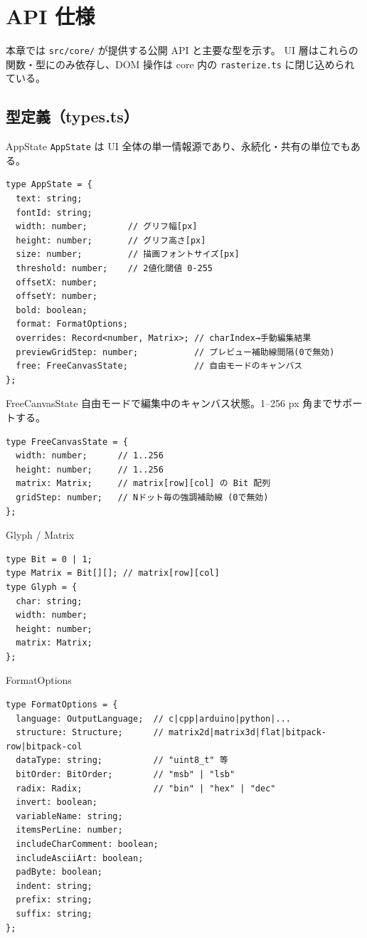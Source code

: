 \section{API 仕様}

本章では \texttt{src/core/} が提供する公開 API と主要な型を示す。
UI 層はこれらの関数・型にのみ依存し、DOM 操作は core 内の
\texttt{rasterize.ts} に閉じ込められている。

\subsection{型定義（types.ts）}

\begin{apibox}{AppState}
\texttt{AppState} は UI 全体の単一情報源であり、永続化・共有の単位でもある。

\begin{lstlisting}
type AppState = {
  text: string;
  fontId: string;
  width: number;        // グリフ幅[px]
  height: number;       // グリフ高さ[px]
  size: number;         // 描画フォントサイズ[px]
  threshold: number;    // 2値化閾値 0-255
  offsetX: number;
  offsetY: number;
  bold: boolean;
  format: FormatOptions;
  overrides: Record<number, Matrix>; // charIndex→手動編集結果
  previewGridStep: number;           // プレビュー補助線間隔(0で無効)
  free: FreeCanvasState;             // 自由モードのキャンバス
};
\end{lstlisting}
\end{apibox}

\begin{apibox}{FreeCanvasState}
自由モードで編集中のキャンバス状態。1--256 px 角までサポートする。

\begin{lstlisting}
type FreeCanvasState = {
  width: number;      // 1..256
  height: number;     // 1..256
  matrix: Matrix;     // matrix[row][col] の Bit 配列
  gridStep: number;   // Nドット毎の強調補助線 (0で無効)
};
\end{lstlisting}
\end{apibox}

\begin{apibox}{Glyph / Matrix}
\begin{lstlisting}
type Bit = 0 | 1;
type Matrix = Bit[][]; // matrix[row][col]
type Glyph = {
  char: string;
  width: number;
  height: number;
  matrix: Matrix;
};
\end{lstlisting}
\end{apibox}

\begin{apibox}{FormatOptions}
\begin{lstlisting}
type FormatOptions = {
  language: OutputLanguage;  // c|cpp|arduino|python|...
  structure: Structure;      // matrix2d|matrix3d|flat|bitpack-row|bitpack-col
  dataType: string;          // "uint8_t" 等
  bitOrder: BitOrder;        // "msb" | "lsb"
  radix: Radix;              // "bin" | "hex" | "dec"
  invert: boolean;
  variableName: string;
  itemsPerLine: number;
  includeCharComment: boolean;
  includeAsciiArt: boolean;
  padByte: boolean;
  indent: string;
  prefix: string;
  suffix: string;
};
\end{lstlisting}
\end{apibox}

